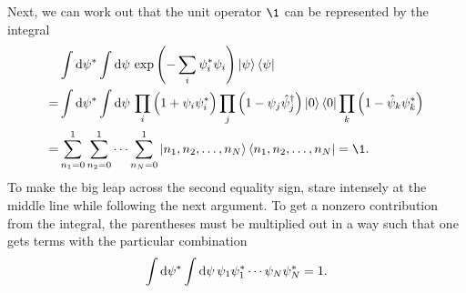 Next, we can work out that the unit operator $\1$ can be represented by the integral
\begin{equation}
\begin{split}
	 \iffalse
	 & \int \dif \conj{\psi} \int \dif \psi \, e^{-\sum_i \conj\psi_i \psi_i} \ket{\psi} \bra{\psi} \\
	=& \int \dif \conj{\psi} \int \dif \psi \, \prod_i \left( 1 + \psi_i \conj{\psi}_i \right) \prod_j \left( 1 - \psi_j \creat_j \right) \ket{0} \bra{0} \prod_k \left( 1 - \destr_k \conj\psi_k \right) \\
	=& \int \dif \conj{\psi} \int \dif \psi \, \prod_i \left( 1 + \psi_i \conj{\psi}_i \right) \prod_j \left( 1 - \psi_j \creat_j \right) \ket{0} \bra{0} \left( 1 - \destr_j \conj\psi_j \right) \\
	=& \sum_{n_1=0}^1 \sum_{n_2=0}^1\cdots \sum_{n_N=0}^1 \ket{n_1, n_2, \ldots, n_N} \bra{n_1, n_2, \ldots, n_N} = \1 \\
	=& \int \dif \conj{\psi} \int \dif \psi \left[ \left( -\sum_i \conj{\psi}_i \psi_i \right) \ket{0} \bra{0} + \left( -\sum_j \psi_j \creat_j \right) \ket{0} \bra{0} \left( -\sum_k \destr_k \conj\psi_k \right) \right] \\
	=& \int \dif \conj{\psi} \int \dif \psi \left[ \sum_i \psi_i \conj\psi_i \ket{0} \bra{0} + \sum_{j,k} \psi_j \conj\psi_k \ket{1_j} \bra{1_k} \right] \\
	=& \ket{0} \bra{0} + \sum_j \ket{1_j} \bra{1_j} = \1 . \\
	\fi
	 & \int \dif \conj{\psi} \int \dif \psi \, \exp \left( -\sum_i \conj\psi_i \psi_i \right) \ket{\psi} \bra{\psi} \\
	=& \int \dif \conj{\psi} \int \dif \psi \, \prod_i \Big( 1 + \psi_i \conj{\psi}_i \Big) \prod_j \left( 1 - \psi_j \creat_j \right) \ket{0} \bra{0} \prod_k \left( 1 - \destr_k \conj\psi_k \right) \\
	=& \sum_{n_1=0}^1 \sum_{n_2=0}^1\cdots \sum_{n_N=0}^1 \ket{n_1, n_2, \ldots, n_N} \bra{n_1, n_2, \ldots, n_N} = \1 . \\
\end{split}
\label{eq:tft:completeness_grassmann_discrete}
\end{equation}
To make the big leap across the second equality sign, stare intensely at the middle line while following the next argument.
To get a nonzero contribution from the integral, the parentheses must be multiplied out in a way such that one gets terms with the particular combination
\begin{equation}
	\int \mathop{}\!\mathrm{d} {\psi}^* \int \mathop{}\!\mathrm{d} \psi \, \psi_1 {\psi}^*_1 \cdots \psi_N {\psi}^*_N = 1 .
\label{eq:tft:integral_saturated}
\end{equation}
